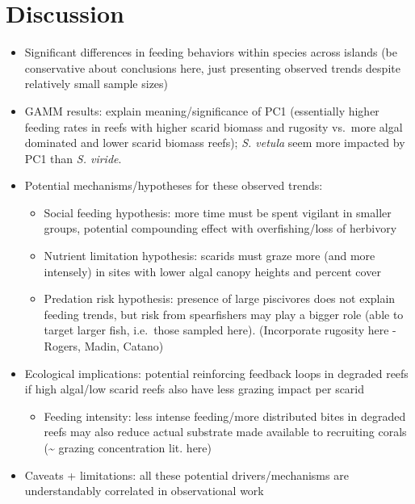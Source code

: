 \documentclass[]{article}
\providecommand{\tightlist}{%
  \setlength{\itemsep}{0pt}\setlength{\parskip}{0pt}}
\begin{document}
\section{Discussion}\label{discussion}

\begin{itemize}
\tightlist
\item
  Significant differences in feeding behaviors within species across
  islands (be conservative about conclusions here, just presenting
  observed trends despite relatively small sample sizes)
\item
  GAMM results: explain meaning/significance of PC1 (essentially higher
  feeding rates in reefs with higher scarid biomass and rugosity
  vs.~more algal dominated and lower scarid biomass reefs); \emph{S.
  vetula} seem more impacted by PC1 than \emph{S. viride}.
\item
  Potential mechanisms/hypotheses for these observed trends:

  \begin{itemize}
  \tightlist
  \item
    Social feeding hypothesis: more time must be spent vigilant in
    smaller groups, potential compounding effect with overfishing/loss
    of herbivory
  \item
    Nutrient limitation hypothesis: scarids must graze more (and more
    intensely) in sites with lower algal canopy heights and percent
    cover
  \item
    Predation risk hypothesis: presence of large piscivores does not
    explain feeding trends, but risk from spearfishers may play a bigger
    role (able to target larger fish, i.e.~those sampled here).
    (Incorporate rugosity here - Rogers, Madin, Catano)
  \end{itemize}
\item
  Ecological implications: potential reinforcing feedback loops in
  degraded reefs if high algal/low scarid reefs also have less grazing
  impact per scarid

  \begin{itemize}
  \tightlist
  \item
    Feeding intensity: less intense feeding/more distributed bites in
    degraded reefs may also reduce actual substrate made available to
    recruiting corals (\textasciitilde{} grazing concentration lit.
    here)
  \end{itemize}
\item
  Caveats + limitations: all these potential drivers/mechanisms are
  understandably correlated in observational work


\end{itemize}
\end{document}
